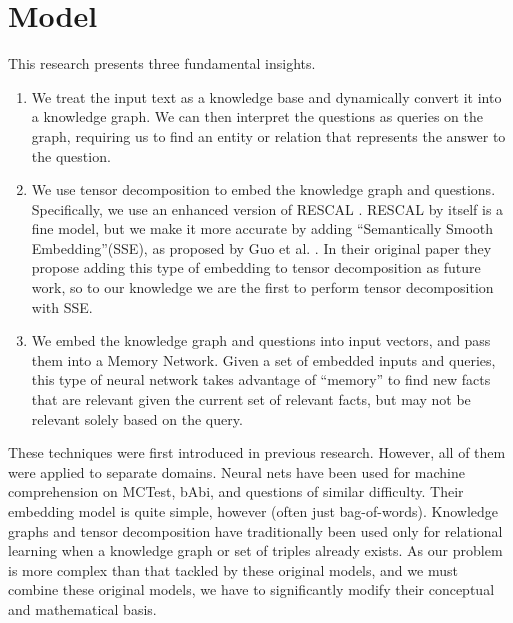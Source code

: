 \documentclass[pageno]{final_paper}
\begin{document}
\section{Model}
\label{Model}

This research presents three fundamental insights. \\

\begin{enumerate}

    \item We treat the input text as a knowledge base and dynamically convert it
    into a knowledge graph. We can then interpret the questions as queries on
    the graph, requiring us to find an entity or relation that represents the
    answer to the question. \\

    \item We use tensor decomposition to embed the knowledge graph and
    questions. Specifically, we use an enhanced version of RESCAL
    \cite{Nickel2011}. RESCAL by itself is a fine model, but we make it more
    accurate by adding ``Semantically Smooth Embedding''(SSE), as proposed by
    Guo et al. \cite{Guo2015}. In their original paper they propose adding this
    type of embedding to tensor decomposition as future work, so to our
    knowledge we are the first to perform tensor decomposition with SSE. \\

    \item We embed the knowledge graph and questions into input vectors, and
    pass them into a Memory Network. Given a set of embedded inputs and queries,
    this type of neural network takes advantage of ``memory'' to find new facts
    that are relevant given the current set of relevant facts, but may not be
    relevant solely based on the query. \\

\end{enumerate}

These techniques were first introduced in previous research. However, all of
them were applied to separate domains. Neural nets have been used for machine
comprehension on MCTest, bAbi, and questions of similar difficulty. Their
embedding model is quite simple, however (often just bag-of-words). Knowledge
graphs and tensor decomposition have traditionally been used only for relational
learning when a knowledge graph or set of triples already exists. As our problem
is more complex than that tackled by these original models, and we must combine
these original models, we have to significantly modify their conceptual and
mathematical basis.
\end{document}
